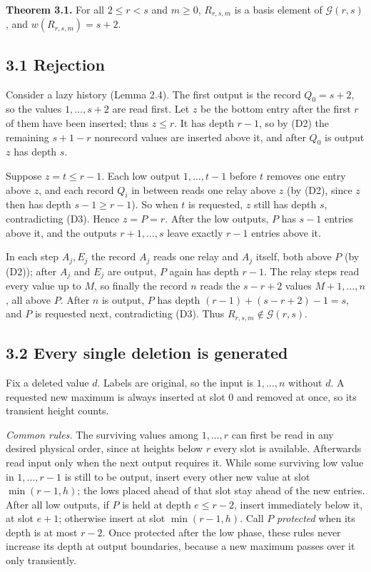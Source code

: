 \documentclass[11pt,letterpaper]{article}
\begin{document}
\textbf{Theorem 3.1.} For all \(2\le r<s\) and \(m\ge0\), \(R_{r,s,m}\)
is a basis element of \(\mathcal G(r,s)\), and \(w(R_{r,s,m})=s+2\).

\subsection{3.1 Rejection}\label{rejection}

Consider a lazy history (Lemma 2.4). The first output is the record
\(Q_0=s+2\), so the values \(1,\dots,s+2\) are read first. Let \(z\) be
the bottom entry after the first \(r\) of them have been inserted; thus
\(z\le r\). It has depth \(r-1\), so by (D2) the remaining \(s+1-r\)
nonrecord values are inserted above it, and after \(Q_0\) is output
\(z\) has depth \(s\).

Suppose \(z=t\le r-1\). Each low output \(1,\dots,t-1\) before \(t\)
removes one entry above \(z\), and each record \(Q_i\) in between reads
one relay above \(z\) (by (D2), since \(z\) then has depth
\(s-1\ge r-1\)). So when \(t\) is requested, \(z\) still has depth
\(s\), contradicting (D3). Hence \(z=P=r\). After the low outputs, \(P\)
has \(s-1\) entries above it, and the outputs \(r+1,\dots,s\) leave
exactly \(r-1\) entries above it.

In each step \(A_j,E_j\) the record \(A_j\) reads one relay and \(A_j\)
itself, both above \(P\) (by (D2)); after \(A_j\) and \(E_j\) are
output, \(P\) again has depth \(r-1\). The relay steps read every value
up to \(M\), so finally the record \(n\) reads the \(s-r+2\) values
\(M+1,\dots,n\), all above \(P\). After \(n\) is output, \(P\) has depth
\((r-1)+(s-r+2)-1=s\), and \(P\) is requested next, contradicting (D3).
Thus \(R_{r,s,m}\notin\mathcal G(r,s)\).

\subsection{3.2 Every single deletion is
generated}\label{every-single-deletion-is-generated}

Fix a deleted value \(d\). Labels are original, so the input is
\(1,\dots,n\) without \(d\). A requested new maximum is always inserted
at slot \(0\) and removed at once, so its transient height counts.

\emph{Common rules.} The surviving values among \(1,\dots,r\) can first
be read in any desired physical order, since at heights below \(r\)
every slot is available. Afterwards read input only when the next output
requires it. While some surviving low value in \(1,\dots,r-1\) is still
to be output, insert every other new value at slot \(\min(r-1,h)\); the
lows placed ahead of that slot stay ahead of the new entries. After all
low outputs, if \(P\) is held at depth \(e\le r-2\), insert immediately
below it, at slot \(e+1\); otherwise insert at slot \(\min(r-1,h)\).
Call \(P\) \emph{protected} when its depth is at most \(r-2\). Once
protected after the low phase, these rules never increase its depth at
output boundaries, because a new maximum passes over it only
transiently.
\end{document}

